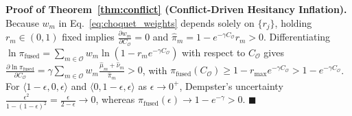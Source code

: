 \documentclass[10pt,twocolumn]{article}
\begin{document}
\noindent\textbf{Proof of Theorem~\ref{thm:conflict} (Conflict-Driven Hesitancy Inflation).}
Because $w_m$ in Eq.~\eqref{eq:choquet_weights} depends solely on $\{r_j\}$, holding $r_m \in
(0, 1)$ fixed implies $\frac{\partial w_m}{\partial C_{\mathcal{O}}} = 0$ and $\hat{\pi}_m = 1
- e^{-\gamma C_{\mathcal{O}}}r_m > 0$. Differentiating $\ln \pi_{\text{fused}} =
\sum_{m\in\mathcal{O}} w_m \ln(1 - r_m e^{-\gamma C_{\mathcal{O}}})$ with respect to
$C_{\mathcal{O}}$ gives $\frac{\partial \ln \pi_{\text{fused}}}{\partial C_{\mathcal{O}}} =
\gamma \sum_{m\in\mathcal{O}} w_m \frac{\hat{\mu}_m + \hat{\nu}_m}{\hat{\pi}_m} > 0$, with
$\pi_{\text{fused}}(C_{\mathcal{O}}) \ge 1 - r_{\max}e^{-\gamma C_{\mathcal{O}}} > 1 -
e^{-\gamma C_{\mathcal{O}}}$. For $\langle 1-\epsilon, 0, \epsilon\rangle$ and $\langle 0,
1-\epsilon, \epsilon\rangle$ as $\epsilon \to 0^+$, Dempster's uncertainty
$\frac{\epsilon^2}{1-(1-\epsilon)^2} = \frac{\epsilon}{2-\epsilon} \to 0$, whereas
$\pi_{\text{fused}}(\epsilon) \to 1 - e^{-\gamma} > 0$. $\blacksquare$
\end{document}
